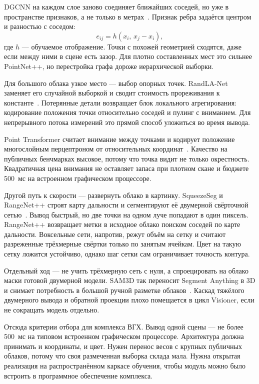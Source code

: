 \documentclass{misisarticle}
\begin{document}
DGCNN на каждом слое заново соединяет ближайших соседей, но уже в пространстве признаков, а не только в метрах~\cite{dgcnn}. Признак ребра задаётся центром и разностью с соседом:
\begin{equation}
e_{ij} = h(x_i,\, x_j - x_i),
\label{eq:edgeconv}
\end{equation}
где $h$ --- обучаемое отображение. Точки с похожей геометрией сходятся, даже если между ними в сцене есть зазор. Для плотно составленных мест это сильнее PointNet++, но перестройка графа дороже иерархической выборки.

Для большого облака узкое место --- выбор опорных точек. RandLA-Net заменяет его случайной выборкой и сводит стоимость прореживания к константе~\cite{randlanet}. Потерянные детали возвращает блок локального агрегирования: кодирование положения точки относительно соседей и пулинг с вниманием. Для непрерывного потока измерений это прямой способ уложиться во время вывода.

Point Transformer считает внимание между точками и кодирует положение многослойным перцептроном от относительных координат~\cite{pointtransformer}. Качество на публичных бенчмарках высокое, потому что точка видит не только окрестность. Квадратичная цена внимания не оставляет запаса при плотном скане и бюджете 500~мс на встроенном графическом процессоре.

Другой путь к скорости --- развернуть облако в картинку. SqueezeSeg и RangeNet++ строят карту дальности и сегментируют её двумерной свёрточной сетью~\cite{squeezeseg,rangenet}. Вывод быстрый, но две точки на одном луче попадают в один пиксель. RangeNet++ возвращает метки в исходное облако поиском соседей по карте дальности. Воксельные сети, напротив, режут объём на сетку и считают разреженные трёхмерные свёртки только по занятым ячейкам. Цвет на такую сетку ложится устойчиво, однако шаг сетки сам ограничивает точность контура.

Отдельный ход --- не учить трёхмерную сеть с нуля, а спроецировать на облако маски готовой двумерной модели. SAM3D так переносит Segment Anything в 3D и снимает потребность в большой ручной разметке облаков~\cite{sam3d}. Каскад тяжёлого двумерного вывода и обратной проекции плохо помещается в цикл Visioner, если не сокращать модель отдельно.

Отсюда критерии отбора для комплекса ВГХ. Вывод одной сцены --- не более 500~мс на типовом встроенном графическом процессоре. Архитектура должна принимать и координаты, и цвет. Нужен перенос весов с крупных публичных облаков, потому что своя размеченная выборка склада мала. Нужна открытая реализация на распространённом каркасе обучения, чтобы модуль можно было встроить в программное обеспечение комплекса.
\end{document}
